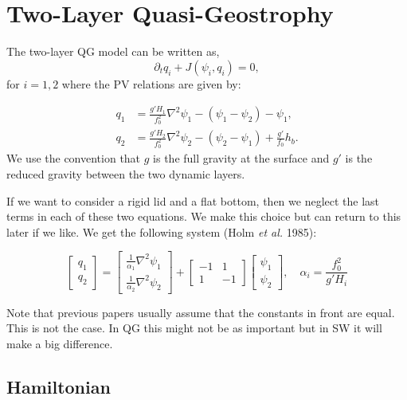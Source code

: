 \documentclass[12pt]{article}
\begin{document}
\section{Two-Layer Quasi-Geostrophy}

The two-layer QG model can be written as,
$$
\partial_t q_i + J(\psi_i, q_i) = 0,
$$
for $i=1,2$ where the PV relations are given by:

\begin{align*}
q_1 &= \frac{g'H_1}{f_0^2}\nabla^2 \psi_1 - (\psi_1 - \psi_2) - \psi_1,\\
q_2 &= \frac{g'H_2}{f_0^2}\nabla^2 \psi_2 - (\psi_2 - \psi_1) + \frac{g'}{f_0} h_b.
\end{align*}
We use the convention that $g$ is the full gravity at the surface and $g'$ is the reduced gravity between the two dynamic layers.  

If we want to consider a rigid lid and a flat bottom, then we neglect the last terms in each of these two equations.  We make this choice but can return to this later if we like. We get the following system (Holm \emph{et al.} 1985):

\begin{equation}
\left[\begin{array}{c}
q_1 \\
q_2
\end{array}\right]
=
\left[\begin{array}{c}
\frac{1}{\alpha_1}\nabla^2 \psi_1 \\
\frac{1}{\alpha_2}\nabla^2 \psi_2
\end{array}\right]
+
\left[\begin{array}{cc}
-1 & 1 \\
1 & -1
\end{array}\right]
\left[\begin{array}{c}
\psi_1 \\
\psi_2
\end{array}\right],
\quad \alpha_i = \frac{f_0^2}{g'H_i}
\end{equation}

Note that previous papers usually assume that the constants in front are equal. This is not the case.  In QG this might not be as important but in SW it will make a big difference.

\subsection{Hamiltonian}
\end{document}
